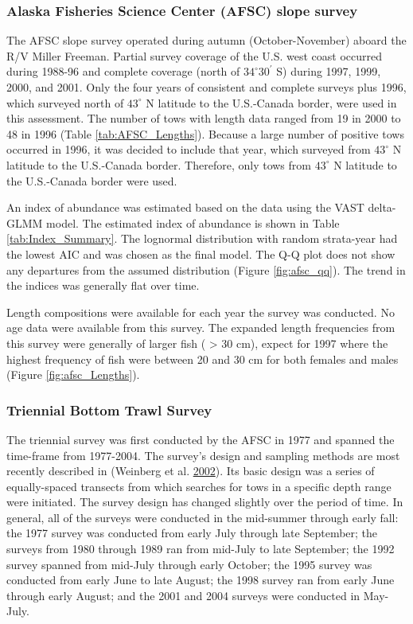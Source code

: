 \documentclass[12pt,]{article}
\begin{document}
\subsubsection{Alaska Fisheries Science Center (AFSC) slope
survey}\label{alaska-fisheries-science-center-afsc-slope-survey}

The AFSC slope survey operated during autumn (October-November) aboard
the R/V Miller Freeman. Partial survey coverage of the U.S. west coast
occurred during 1988-96 and complete coverage (north of
\(34^\circ 30^\prime\) S) during 1997, 1999, 2000, and 2001. Only the
four years of consistent and complete surveys plus 1996, which surveyed
north of \(43^\circ\) N latitude to the U.S.-Canada border, were used in
this assessment. The number of tows with length data ranged from 19 in
2000 to 48 in 1996 (Table \ref{tab:AFSC_Lengths}). Because a large
number of positive tows occurred in 1996, it was decided to include that
year, which surveyed from \(43^\circ\) N latitude to the U.S.-Canada
border. Therefore, only tows from \(43^\circ\) N latitude to the
U.S.-Canada border were used.

An index of abundance was estimated based on the data using the VAST
delta-GLMM model. The estimated index of abundance is shown in Table
\ref{tab:Index_Summary}. The lognormal distribution with random
strata-year had the lowest AIC and was chosen as the final model. The
Q-Q plot does not show any departures from the assumed distribution
(Figure \ref{fig:afsc_qq}). The trend in the indices was generally flat
over time.

Length compositions were available for each year the survey was
conducted. No age data were available from this survey. The expanded
length frequencies from this survey were generally of larger fish (
\textgreater{} 30 cm), expect for 1997 where the highest frequency of
fish were between 20 and 30 cm for both females and males (Figure
\ref{fig:afsc_Lengths}).

\subsubsection{Triennial Bottom Trawl
Survey}\label{triennial-bottom-trawl-survey}

The triennial survey was first conducted by the AFSC in 1977 and spanned
the time-frame from 1977-2004. The survey's design and sampling methods
are most recently described in (Weinberg et al.
\protect\hyperlink{ref-weinberg_estimation_2002}{2002}). Its basic
design was a series of equally-spaced transects from which searches for
tows in a specific depth range were initiated. The survey design has
changed slightly over the period of time. In general, all of the surveys
were conducted in the mid-summer through early fall: the 1977 survey was
conducted from early July through late September; the surveys from 1980
through 1989 ran from mid-July to late September; the 1992 survey
spanned from mid-July through early October; the 1995 survey was
conducted from early June to late August; the 1998 survey ran from early
June through early August; and the 2001 and 2004 surveys were conducted
in May-July.
\end{document}
